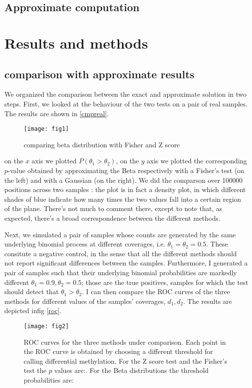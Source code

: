 \documentclass[11pt]{amsart}
\begin{document}
\subsection{Approximate computation}
\section{Results and methods} 
\subsection{comparison with approximate results}
We organized the comparison between the exact and approximate solution in two steps. First,
we looked at the behaviour of the two tests on a pair of real samples. The results are shown in \ref{cmpreal}.
\begin{figure}[h]
\caption{comparing beta distribution with Fisher and Z score}
\texttt{[image: fig1]}
\end{figure}\label{cmpreal}
on the $x$ axis we plotted $P(\theta_1>\theta_2)$, on the $y$ axis we plotted the corresponding $p$-value obtained by approximating the Beta respectively with a Fisher's test (on the left) and with a Gaussian (on the right).
We did the comparson over 100000 positions across two samples : the plot is in fact a density plot, in which different shades of blue indicate how many times the two values fall into a certain region of the plane. There's not much to comment there, except to note that, as expected, there's a broad correspondence between the different methods.

Next, we simulated a pair of samples whose counts are generated by the same underlying binomial process at different coverages, i.e. $\theta_1=\theta_2=0.5$. These consitute a negative control, in the sense that all the different methods should not report significant differences between the samples. Furthermore, I generated a pair of samples such that their underlying binomial probabilities are markedly different $\theta_1=0.9,\theta_2=0.5$; those are the true positives, samples for which the test should detect that $\theta_1>\theta_2$. I can then compare the ROC curves of the three methods for different values of the samples' coverages, $d_1,d_2$. 
The results are depicted infig \ref{roc}.
\begin{figure}[h]
\caption{ROC curves for the three methods under comparison. Each point in the ROC curve is obtained by choosing a different threshold for calling differential methylation. For the Z score test and the Fisher's test the $p$ values are:. For the Beta distributions the threshold probabilities are: }
\texttt{[image: fig2]}
\end{figure}\label{roc}
\end{document}
